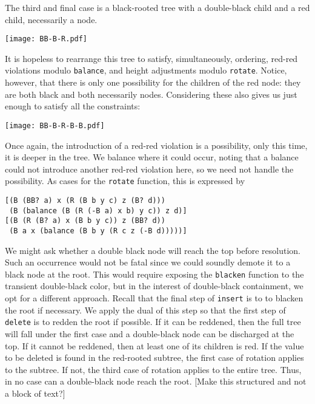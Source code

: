 \documentclass[preprint]{sigplanconf}
\begin{document}
The third and final case is a black-rooted tree with a double-black child and a red child, necessarily a node.
\begin{center}
\texttt{[image: BB-B-R.pdf]}
\end{center}
It is hopeless to rearrange this tree to satisfy, simultaneously, ordering, red-red violations modulo \texttt{balance}, and height adjustments modulo \texttt{rotate}. Notice, however, that there is only one possibility for the children of the red node: they are both black and both necessarily nodes. Considering these also gives us just enough to satisfy all the constraints:
\begin{center}
\texttt{[image: BB-B-R-B-B.pdf]}
\end{center}
Once again, the introduction of a red-red violation is a possibility, only this time, it is deeper in the tree. We balance where it could occur, noting that a balance could not introduce another red-red violation here, so we need not handle the possibility. As cases for the \texttt{rotate} function, this is expressed by
\begin{verbatim}
[(B (BB? a) x (R (B b y c) z (B? d)))
 (B (balance (B (R (-B a) x b) y c)) z d)]
[(B (R (B? a) x (B b y c)) z (BB? d))
 (B a x (balance (B b y (R c z (-B d)))))]
\end{verbatim}

We might ask whether a double black node will reach the top before resolution. Such an occurrence would not be fatal since we could soundly demote it to a black node at the root. This would require exposing the \texttt{blacken} function to the transient double-black color, but in the interest of double-black containment, we opt for a different approach. Recall that the final step of \texttt{insert} is to to blacken the root if necessary. We apply the dual of this step so that the first step of \texttt{delete} is to redden the root if possible. If it can be reddened, then the full tree will fall under the first case and a double-black node can be discharged at the top. If it cannot be reddened, then at least one of its children is red. If the value to be deleted is found in the red-rooted subtree, the first case of rotation applies to the subtree. If not, the third case of rotation applies to the entire tree. Thus, in no case can a double-black node reach the root. [Make this structured and not a block of text?]

\end{document}
